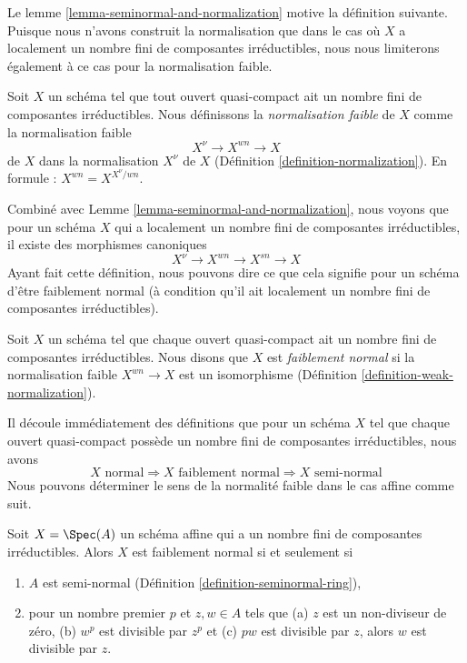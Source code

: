 \noindent
Le lemme \ref{lemma-seminormal-and-normalization} motive la définition suivante. Puisque
nous n'avons construit la normalisation que dans le cas
où $X$ a localement un nombre fini de composantes irréductibles,
nous nous limiterons également à ce cas pour la normalisation faible.

\begin{definition}
\label{definition-weak-normalization}
Soit $X$ un schéma tel que tout ouvert quasi-compact ait un nombre fini
de composantes irréductibles. Nous définissons la {\it
normalisation faible} de $X$ comme la normalisation faible
$$
X^\nu \longrightarrow X^{wn} \longrightarrow X
$$
de $X$ dans la normalisation $X^\nu$
de $X$ (Définition \ref{definition-normalization}).
En formule : $X^{wn} = X^{X^\nu/wn}$.
\end{definition}

\noindent
Combiné avec Lemme \ref{lemma-seminormal-and-normalization}, nous voyons que pour un schéma $X$
qui a localement un nombre fini de composantes irréductibles, il existe
des morphismes canoniques
$$
X^\nu \to X^{wn} \to X^{sn} \to X
$$
Ayant fait cette définition, nous pouvons dire ce que cela signifie pour un schéma d'être
faiblement normal (à condition qu'il ait localement un nombre fini de composantes
irréductibles).

\begin{definition}
\label{definition-weakly-normal}
Soit $X$ un schéma tel que chaque ouvert quasi-compact ait un
nombre fini de composantes irréductibles. Nous disons que $X$ est {\it
faiblement normal} si la normalisation faible
$X^{wn} \to X$ est un isomorphisme (Définition \ref{definition-weak-normalization}).
\end{definition}

\noindent
Il découle immédiatement des définitions que pour un schéma $X$ tel que chaque
ouvert quasi-compact possède un nombre fini de composantes irréductibles, nous
avons
$$
X\text{ normal} \Rightarrow
X\text{ faiblement normal} \Rightarrow
X\text{ semi-normal}
$$
Nous pouvons déterminer le sens de la normalité faible dans le cas affine comme suit.

\begin{lemma}
\label{lemma-affine-weakly-normal}
Soit $X = \Spec(A)$ un schéma affine qui a un nombre fini de composantes irréductibles.
Alors $X$ est faiblement normal si et seulement si
\begin{enumerate}
\item $A$ est semi-normal (Définition \ref{definition-seminormal-ring}),
\item pour un nombre premier $p$ et $z, w \in A$ tels que (a) $z$
est un non-diviseur de zéro, (b) $w^p$ est divisible par $z^p$ et (c) $pw$
est divisible par $z$, alors $w$ est divisible par $z$.
\end{enumerate}
\end{lemma}

